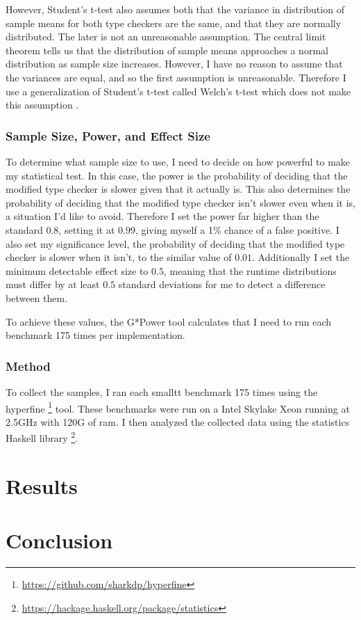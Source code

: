 \documentclass{article}
\begin{document}
However, Student's t-test also assumes both that the variance in distribution of sample means for both type checkers are the same, and that they are normally distributed.
The later is not an unreasonable assumption.
The central limit theorem tells us that the distribution of sample means approaches a normal distribution as sample size increases.
However, I have no reason to assume that the variances are equal, and so the first assumption is unreasonable.
Therefore I use a generalization of Student's t-test called Welch's t-test which does not make this assumption \citep{Welch1947}.

\newpage

\subsubsection{Sample Size, Power, and Effect Size}

To determine what sample size to use, I need to decide on how powerful to make my statistical test.
In this case, the power is the probability of deciding that the modified type checker is slower given that it actually is.
This also determines the probability of deciding that the modified type checker isn't slower even when it is, a situation I'd like to avoid.
Therefore I set the power far higher than the standard $0.8$, setting it at $0.99$, giving myself a 1\% chance of a false positive.
I also set my significance level, the probability of deciding that the modified type checker is slower when it isn't, to the similar value of $0.01$.
Additionally I set the minimum detectable effect size to $0.5$, meaning that the runtime distributions must differ by at least $0.5$ standard deviations for me to detect a difference between them.

To achieve these values, the G*Power tool \citep{Faul2009} calculates that I need to run each benchmark 175 times per implementation.

\subsubsection{Method}
To collect the samples, I ran each smalltt benchmark 175 times using the hyperfine \footnote{\url{https://github.com/sharkdp/hyperfine}} tool.
These benchmarks were run on a Intel Skylake Xeon running at 2.5GHz with 120G of ram.
I then analyzed the collected data using the statistics Haskell library \footnote{\url{https://hackage.haskell.org/package/statistics}}.


\section{Results}

\section{Conclusion}

\newpage

\printbibliography

\todos
\end{document}
